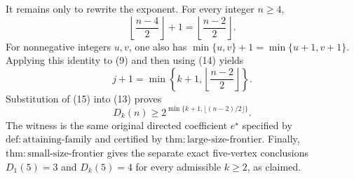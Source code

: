 It remains only to rewrite the exponent.  For every integer \(n\geq4\),
\[
 \left\lfloor\frac{n-4}{2}\right\rfloor+1
 =\left\lfloor\frac{n-2}{2}\right\rfloor.
\tag{14}
\]
For nonnegative integers \(u,v\), one also has \(\min\{u,v\}+1=\min\{u+1,v+1\}\).  Applying this identity to (9) and then using (14) yields
\[
 j+1
 =\min\!\left\{k+1,\left\lfloor\frac{n-2}{2}\right\rfloor\right\}.
\tag{15}
\]
Substitution of (15) into (13) proves
\[
 D_k(n)\geq
 2^{\min\{k+1,\lfloor(n-2)/2\rfloor\}}.
\]
The witness is the same original directed coefficient \(e^{\star}\) specified by \(\mathrm{def:attaining\mbox{-}family}\) and certified by \(\mathrm{thm:large\mbox{-}size\mbox{-}frontier}\).  Finally, \(\mathrm{thm:small\mbox{-}size\mbox{-}frontier}\) gives the separate exact five-vertex conclusions \(D_1(5)=3\) and \(D_k(5)=4\) for every admissible \(k\geq2\), as claimed.
